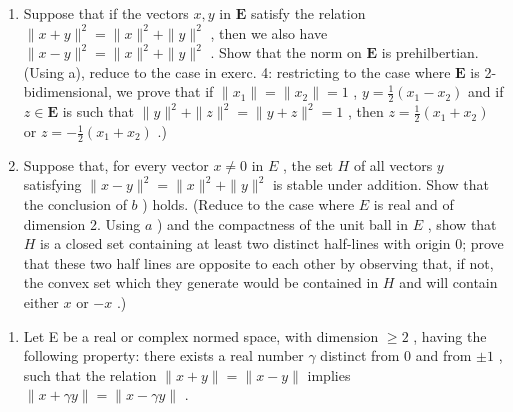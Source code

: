 \begin{enumerate}
\def\labelenumi{\alph{enumi})}
\setcounter{enumi}{1}
\item
  Suppose that if the vectors \(x, y\) in \(\mathbf{E}\) satisfy the relation \(\| x + y\|^2 = \| x\|^2 + \| y\|^2\) , then we also have \(\| x - y\|^2 = \| x\|^2 + \| y\|^2\) . Show that the norm on \(\mathbf{E}\) is prehilbertian. (Using a), reduce to the case in exerc. 4: restricting to the case where \(\mathbf{E}\) is 2-bidimensional, we prove that if \(\| x_1\| = \| x_2\| = 1\) , \(y = \frac{1}{2}(x_1 - x_2)\) and if \(z \in \mathbf{E}\) is such that \(\| y\|^2 + \| z\|^2 = \| y + z\|^2 = 1\) , then \(z = \frac{1}{2}(x_1 + x_2)\) or \(z = -\frac{1}{2}(x_1 + x_2)\) .)
\item
  Suppose that, for every vector \(x \neq 0\) in \(E\) , the set \(H\) of all vectors \(y\) satisfying \(\| x - y \|^2 = \| x \|^2 + \| y \|^2\) is stable under addition. Show that the conclusion of \(b\) ) holds. (Reduce to the case where \(E\) is real and of dimension 2. Using \(a\) ) and the compactness of the unit ball in \(E\) , show that \(H\) is a closed set containing at least two distinct half-lines with origin 0; prove that these two half lines are opposite to each other by observing that, if not, the convex set which they generate would be contained in \(H\) and will contain either \(x\) or \(-x\) .)
\end{enumerate}

\begin{enumerate}
\def\labelenumi{\arabic{enumi})}
\setcounter{enumi}{6}
\tightlist
\item
  Let E be a real or complex normed space, with dimension \(\geqslant 2\) , having the following property: there exists a real number \(\gamma\) distinct from 0 and from \(\pm 1\) , such that the relation \(\| x + y \| = \| x - y \|\) implies \(\| x + \gamma y \| = \| x - \gamma y \|\) .
\end{enumerate}

